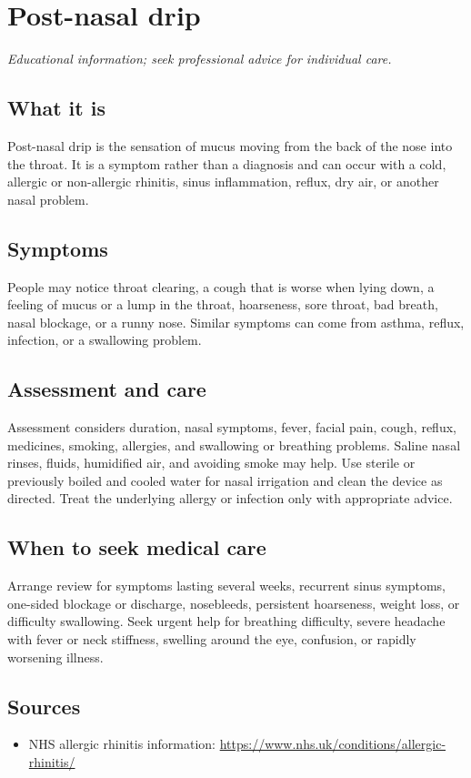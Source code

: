 \chapter{Post-nasal drip}

\medskip
\noindent\textit{Educational information; seek professional advice for individual care.}

\section*{What it is}
Post-nasal drip is the sensation of mucus moving from the back of the nose into the throat. It is a symptom rather than a diagnosis and can occur with a cold, allergic or non-allergic rhinitis, sinus inflammation, reflux, dry air, or another nasal problem.

\section*{Symptoms}
People may notice throat clearing, a cough that is worse when lying down, a feeling of mucus or a lump in the throat, hoarseness, sore throat, bad breath, nasal blockage, or a runny nose. Similar symptoms can come from asthma, reflux, infection, or a swallowing problem.

\section*{Assessment and care}
Assessment considers duration, nasal symptoms, fever, facial pain, cough, reflux, medicines, smoking, allergies, and swallowing or breathing problems. Saline nasal rinses, fluids, humidified air, and avoiding smoke may help. Use sterile or previously boiled and cooled water for nasal irrigation and clean the device as directed. Treat the underlying allergy or infection only with appropriate advice.

\section*{When to seek medical care}
Arrange review for symptoms lasting several weeks, recurrent sinus symptoms, one-sided blockage or discharge, nosebleeds, persistent hoarseness, weight loss, or difficulty swallowing. Seek urgent help for breathing difficulty, severe headache with fever or neck stiffness, swelling around the eye, confusion, or rapidly worsening illness.

\section*{Sources}
\begin{itemize}
\item NHS allergic rhinitis information: \url{https://www.nhs.uk/conditions/allergic-rhinitis/}
\end{itemize}
